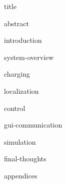 \documentclass[11pt,titlepage]{report}
\begin{document}
{title}

\clearpage
{abstract}
\tableofcontents
				
\clearpage
{}
{introduction}

{system-overview}

{charging}

{localization}

{control}

{gui-communication}

{simulation}

{final-thoughts}

\clearpage
{}
\printbibliography[heading=bibintoc]

\clearpage
{appendices}
\end{document}
